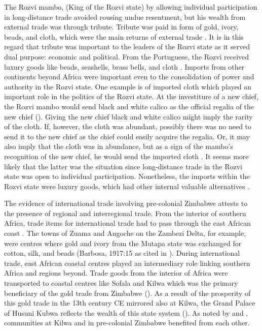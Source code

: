 The Rozvi mambo, (King of the Rozvi state) by allowing individual participation in long-distance trade avoided rousing undue resentment, but his wealth from external trade was through tribute. Tribute was paid in form of gold, ivory, beads, and cloth, which were the main returns of external trade \parencite{mudenge1974}. It is in this regard that tribute was important to the leaders of the Rozvi state as it served dual purpose: economic and political.
From the Portuguese, the Rozvi received luxury goods like beads, seashells, brass bells, and cloth \parencite{mudenge1974}.
Imports from other continents beyond Africa were important even to the consolidation of power and authority in the Rozvi state. One example is of imported cloth which played an important role in the politics of the Rozvi state. At the investiture of a new chief, the Rozvi mambo would send black and white calico as the official regalia of the new chief (\cites{mudenge1974}{bvocho2005}).
Giving the new chief black and white calico might imply the rarity of the cloth. If, however,  the cloth was abundant, possibly there was no need to send it to the new chief as the chief could easily acquire the regalia. Or, it may also imply that the cloth was in abundance, but as a sign of the mambo’s recognition of the new chief, he would send the imported cloth
\parencite{bvocho2005}. It seems more likely that the latter was the situation since long-distance trade in the Rozvi state was open to individual participation. Nonetheless, the imports within the Rozvi state were luxury goods, which had other internal valuable alternatives
\parencite{mudenge1974}.

The evidence of international trade involving pre-colonial Zimbabwe attests to the presence of regional and interregional trade. From the interior of southern Africa, trade items for international trade had to pass through the east African coast \parencite{pwiti2005}. The towns of Zuama and Angoche on the Zambezi Delta, for example, were centres where gold and ivory from the Mutapa state was exchanged for cotton, silk, and beads (Barbosa, 1917:15 as cited in \cite[][130]{kusimba1999}). During international trade, east African coastal centres played an intermediary role linking southern Africa and regions beyond. Trade goods from the interior of Africa were transported to coastal centres like Sofala and Kilwa which was the primary beneficiary of the gold trade from Zimbabwe (\cites{miller2000}{pwiti2005}{pikirayi2006}{huffman2009}).
As a result of the prosperity of this gold trade in the 13th century CE mirrored also at Kilwa, the Grand Palace of Husuni Kubwa reflects the wealth of this state system (\cites{pikirayi2006}{pikirayi2017}).
As noted by \textcite[][387]{pwiti2005} and \textcite{pikirayi2017},
communities at Kilwa and in pre-colonial Zimbabwe benefited from each other.

